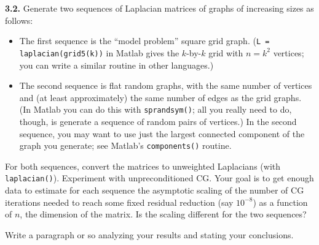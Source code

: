 \documentclass[11pt]{article}
\begin{document}
\par\medskip
{\bf 3.2.}
Generate two sequences of Laplacian matrices of graphs of increasing sizes as
follows:  
\begin{itemize}
\item
The first sequence is the ``model problem'' square grid graph.
({\tt L = laplacian(grid5(k))} in Matlab
gives the $k$-by-$k$ grid with $n=k^2$ vertices;
you can write a similar routine in other languages.)
\item
The second sequence is flat random graphs, with the same number of vertices
and (at least approximately) the same number of edges as the grid graphs.
(In Matlab you can do this with {\tt sprandsym()};
all you really need to do, though, is generate a sequence of random
pairs of vertices.)
In the second sequence, you may want to use just the largest connected 
component of the graph you generate; see Matlab's {\tt components()} routine.
\end{itemize}
For both sequences, convert the matrices to unweighted Laplacians 
(with {\tt laplacian()}).
Experiment with unpreconditioned CG.
Your goal is to get enough data to estimate for each sequence the 
asymptotic scaling of the number of CG iterations needed to reach 
some fixed residual reduction (say $10^{-8}$) as a function of $n$, 
the dimension of the matrix.  
Is the scaling different for the two sequences?
\par
Write a paragraph or so analyzing your results and stating your conclusions.
\end{document}
